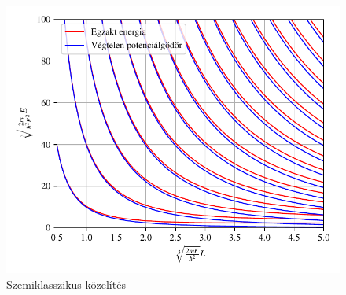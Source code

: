 	\begin{figure}[H]
		\includegraphics[scale=1]{./figs/infsquareenergia.pdf}
		\caption{Szemiklasszikus közelítés}
	\end{figure}

